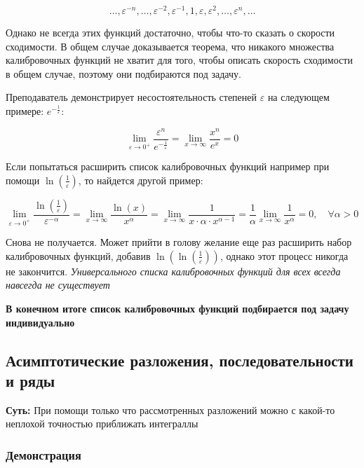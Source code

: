	\[
	\dots, \varepsilon^{-n}, \dots, \varepsilon^{-2}, \varepsilon^{-1}, 1, \varepsilon, \varepsilon^2, \dots, \varepsilon^n, \dots
	\]
	
	Однако не всегда этих функций достаточно, чтобы что-то сказать о скорости сходимости. В общем случае доказывается теорема, что никакого множества калибровочных функций не хватит для того, чтобы описать скорость сходимости в общем случае, поэтому они подбираются под задачу.
	
	Преподаватель демонстрирует несостоятельность степеней $\varepsilon$ на следующем примере: $e^{-\frac 1 \varepsilon}$:
	
	\begin{equation}
		\lim_{\varepsilon \to 0^+} \frac{\varepsilon^n}{e^{-\frac{1}{\varepsilon}}} = \lim_{x \to \infty} \frac{x^n}{e^x} = 0
	\end{equation}
	
	Если попытаться расширить список калибровочных функций например при помощи $\ln\left(\frac 1 \varepsilon \right)$, то найдется другой пример:
	
	\begin{equation}
		\lim_{\varepsilon \to 0^+} \frac{\ln\left(\frac{1}{\varepsilon}\right)}{\varepsilon^{-\alpha}} = \lim_{x \to \infty} \frac{\ln(x)}{x^\alpha} = \lim_{x \to \infty} \frac{1}{x \cdot \alpha \cdot x^{\alpha-1}} = \frac{1}{\alpha} \lim_{x \to \infty} \frac{1}{x^\alpha} = 0, \quad \forall \alpha > 0
	\end{equation}
	
	Снова не получается. Может прийти в голову желание еще раз расширить набор калибровочных функций, добавив $\ln\left(\ln\left(\frac 1 \varepsilon\right)\right)$, однако этот процесс никогда не закончится. \textit{Универсального списка калибровочных функций для всех всегда навсегда не существует}
	
	\textbf{В конечном итоге список калибровочных функций подбирается под задачу индивидуально}
	
	\subsection{Асимптотические разложения, последовательности и ряды}
	
	\textbf{Суть:} При помощи только что рассмотренных разложений можно с какой-то неплохой точностью приближать интеграллы
	
	\subsubsection{Демонстрация}
	
